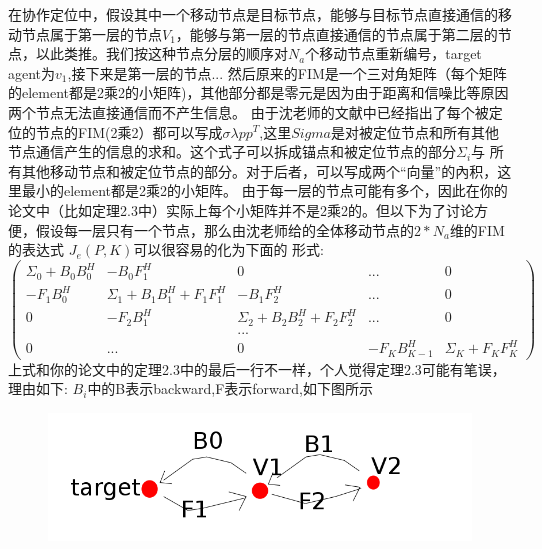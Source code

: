 \documentclass[12pt]{article}
\begin{document}
\title{\textbf{}} 

\author{}
\maketitle
\large
在协作定位中，假设其中一个移动节点是目标节点，能够与目标节点直接通信的移动节点属于第一层的节点$V_1$，能够与第一层的节点直接通信的节点属于第二层的节点，以此类推。我们按这种节点分层的顺序对$N_a$个移动节点重新编号，target agent为$v_1$,接下来是第一层的节点...
然后原来的FIM是一个三对角矩阵（每个矩阵的element都是2乘2的小矩阵)，其他部分都是零元是因为由于距离和信噪比等原因两个节点无法直接通信而不产生信息。
由于沈老师的文献中已经指出了每个被定位的节点的FIM(2乘2）都可以写成$\sigma \lambda pp^T$,这里$Sigma$是对被定位节点和所有其他节点通信产生的信息的求和。这个式子可以拆成锚点和被定位节点的部分$\Sigma_i$与
所有其他移动节点和被定位节点的部分。对于后者，可以写成两个“向量”的內积，这里最小的element都是2乘2的小矩阵。
由于每一层的节点可能有多个，因此在你的论文中（比如定理2.3中）实际上每个小矩阵并不是2乘2的。但以下为了讨论方便，假设每一层只有一个节点，那么由沈老师给的全体移动节点的$2*N_a$维的FIM的表达式
$J_e(P,K)$可以很容易的化为下面的
形式:
\[
\left(
\begin{array}{ccccc}
\Sigma_0+B_0 B_0^H & -B_0 F_1^H & 0 &...& 0 \\
-F_1B_0^H & \Sigma_1+B_1 B_1^H +F_1 F_1^H & -B_1F_2^H & ...&0 \\
0&-F_2B_1^H&\Sigma_2+B_2B_2^H+F_2F_2^H & ...&0\\
&&...&&\\
0&...&0&-F_{K}B_{K-1}^H&\Sigma_K+F_K F_K^H
\end{array}
\right)
\]\newpage
上式和你的论文中的定理2.3中的最后一行不一样，个人觉得定理2.3可能有笔误，理由如下:
$B_i$中的B表示backward,F表示forward,如下图所示
\begin{figure}[!ht]
\includegraphics[width=\linewidth]{001.png}
\end{figure}
\end{document}
